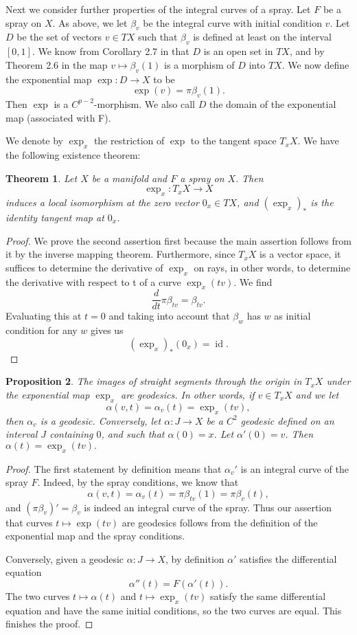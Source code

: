 \documentclass[a5paper,10pt,twoside]{article}
\DeclareMathOperator*{\id}{id}
\theoremstyle{plain}
\newtheorem{teo}{Theorem}[section]
\newtheorem{prop}[teo]{Proposition}
\theoremstyle{definition}
\theoremstyle{remark}
\begin{document}
Next we consider further properties of the integral curves of a spray. Let $F$ be a spray on $X.$ As above, we let $\beta_v$ be the integral curve with initial condition $v$. Let $D$ be the set of vectors $v\in TX$ such that $\beta_v$ is defined at least on the interval $[0, 1].$ We know from Corollary 2.7 in \cite{lang1999} that $D$ is an open set in $TX$, and by Theorem 2.6 in \cite{lang1999} the map $v\mapsto \beta_v(1)$ is a morphism of $D$ into $TX$. We now define the exponential map $\exp: D\to X$ to be
$$
\exp(v)=\pi\beta_v(1).
$$
Then $\exp$ is a $C^{p-2}$-morphism.  We also call $D$ the domain of the exponential map (associated with F).

We denote by $\exp_x$ the restriction of $\exp$ to the tangent space $T_xX$. We have the following existence theorem:

\begin{teo}
Let $X$ be a manifold and $F$ a spray on $X.$ Then
$$ \exp_x:T_xX\to X$$
induces a local isomorphism at the zero vector $0_x\in TX$, and $(\exp_x)_*$ is the identity tangent map at $0_x$.
\end{teo}

\begin{proof}
We prove the second assertion first because the main assertion
follows from it by the inverse mapping theorem. Furthermore, since $T_xX$ is
a vector space, it suffices to determine the derivative of $\exp_x$ on rays, in other words, to determine the derivative with respect to t of a curve $\exp_x(tv).$ We find
$$ \frac{d}{dt}\pi\beta_{tv}=\beta_{tv}.$$
Evaluating this at $t = 0$ and taking into account that $\beta_w$ has $w$ as initial condition for any $w$ gives us
$$ (\exp_x)_*(0_x)=\id.$$
\end{proof}

\begin{prop}
The images of straight segments through the origin in $T_xX$ under the exponential map $\exp_x$ are geodesics. In other words, if $v\in T_xX$ and we let 
$$
\alpha(v,t)=\alpha_v(t)=\exp_x(tv),
$$
then $\alpha_v$ is a geodesic. Conversely, let $\alpha:J\to X$ be a $C^2$ geodesic defined on an interval $J$ containing $0$, and such that $\alpha(0)=x$. Let $\alpha'(0)=v$. Then $\alpha(t)=\exp_x(tv).$
\end{prop}

\begin{proof}
The first statement by definition means that $\alpha_v'$ is an integral
curve of the spray $F.$ Indeed, by the spray conditions, we know that
$$
\alpha(v,t)=\alpha_v(t)=\pi\beta_{tv}(1)=\pi\beta_v(t),
$$
and $(\pi\beta_v)'=\beta_v$ is  indeed an integral curve of the spray. Thus our assertion that curves $t\mapsto \exp(tv)$ are geodesics follows from the definition of the exponential map and the spray conditions.

Conversely, given a geodesic $\alpha: J\to X$, by definition $\alpha'$ satisfies the differential equation $$\alpha''(t)=F\left(\alpha'(t)\right).$$ The two curves $t\mapsto \alpha(t)$ and $t\mapsto\exp_x(tv)$ satisfy the  same differential equation and have the same initial conditions, so the two curves are equal. This finishes the proof.
\end{proof}
\end{document}
